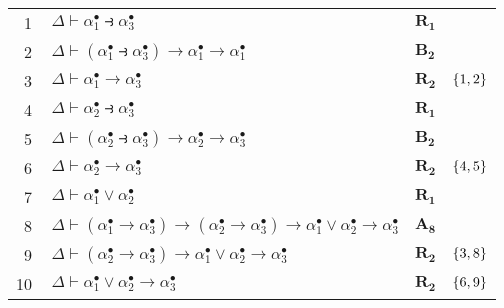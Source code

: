 \begin{tcolorbox}[enhanced jigsaw, breakable, sharp corners, colframe=black, colback=white, boxrule=0.5pt, left=1.5mm, right=1.5mm, top=1.5mm, bottom=1.5mm]
        \vspace{.5\baselineskip}
        \footnotesize
        \setlength{\rowskip}{.5\baselineskip}
        \begin{xltabular}{\textwidth}{r | X l l}
            \scriptsize{\phantom{0}1}\phantom{ } & $\ \Delta \vdash \alpha_1^\bullet\strictif\alpha_3^\bullet$ & $\hyperref[modal.rule.1]{\mathbf{R_1}}$\phantom{1}                & \\[\rowskip]
            \scriptsize{\phantom{0}2}\phantom{ } & $\ \Delta \vdash (\alpha_1^\bullet\strictif\alpha_3^\bullet)\to\alpha_1^\bullet\to\alpha_1^\bullet$ & $\hyperref[modal.axiom.modal.2]{\mathbf{B_2}}$ & \\[\rowskip]
            \scriptsize{\phantom{0}3}\phantom{ } & $\ \Delta \vdash \alpha_1^\bullet\to\alpha_3^\bullet$ & $\hyperref[modal.rule.2]{\mathbf{R_2}}$ & $\left\{1,2\right\}$\\[\rowskip]
            \scriptsize{\phantom{0}4}\phantom{ } & $\ \Delta \vdash \alpha_2^\bullet\strictif\alpha_3^\bullet$ & $\hyperref[modal.rule.1]{\mathbf{R_1}}$ & \\[\rowskip]
            \scriptsize{\phantom{0}5}\phantom{ } & $\ \Delta \vdash (\alpha_2^\bullet\strictif\alpha_3^\bullet)\to\alpha_2^\bullet\to\alpha_3^\bullet$ & $\hyperref[modal.axiom.modal.2]{\mathbf{B_2}}$ & \\[\rowskip]
            \scriptsize{\phantom{0}6}\phantom{ } & $\ \Delta \vdash \alpha_2^\bullet\to\alpha_3^\bullet$ & $\hyperref[modal.rule.2]{\mathbf{R_2}}$ & $\left\{4,5\right\}$\\[\rowskip]
            \scriptsize{\phantom{0}7}\phantom{ } & $\ \Delta \vdash \alpha_1^\bullet\vee\alpha_2^\bullet$ & $\hyperref[modal.rule.1]{\mathbf{R_1}}$ & \\[\rowskip]
            \scriptsize{\phantom{0}8}\phantom{ } & $\ \Delta \vdash (\alpha_1^\bullet\to\alpha_3^\bullet)\to(\alpha_2^\bullet\to\alpha_3^\bullet)\to\alpha_1^\bullet\vee\alpha_2^\bullet\to\alpha_3^\bullet$ & $\hyperref[modal.axiom.8]{\mathbf{A_8}}$ & \\[\rowskip]
            \scriptsize{\phantom{0}9}\phantom{ } & $\ \Delta \vdash (\alpha_2^\bullet\to\alpha_3^\bullet)\to\alpha_1^\bullet\vee\alpha_2^\bullet\to\alpha_3^\bullet$ & $\hyperref[modal.rule.2]{\mathbf{R_2}}$ & $\left\{3,8\right\}$\\[\rowskip]
            \scriptsize{10}\phantom{ } & $\ \Delta \vdash \alpha_1^\bullet\vee\alpha_2^\bullet\to\alpha_3^\bullet$ & $\hyperref[modal.rule.2]{\mathbf{R_2}}$ & $\left\{6,9\right\}$\\[\rowskip]

\end{xltabular}
\end{tcolorbox}
